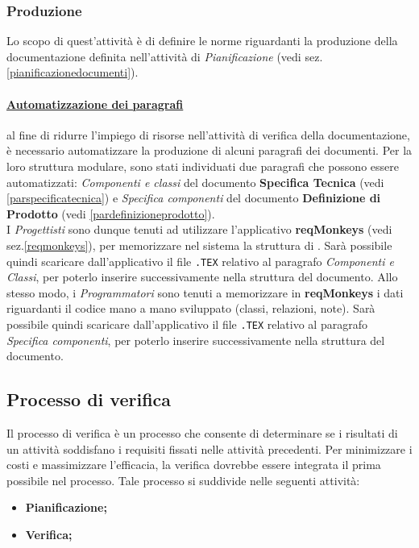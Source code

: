 \subsubsection{Produzione}
Lo scopo di quest'attività è di definire le norme riguardanti la produzione della documentazione definita nell'attività di \textit{Pianificazione} (vedi sez. \ref{pianificazionedocumenti}).

\paragraph{\underline{Automatizzazione dei paragrafi}}
\label{automatizzazioneparagrafi}
al fine di ridurre l'impiego di risorse nell'attività di verifica della documentazione, è necessario automatizzare la produzione di alcuni paragrafi dei documenti. Per la loro struttura modulare, sono stati individuati due paragrafi che possono essere automatizzati: \textit{Componenti e classi} del documento \textbf{Specifica Tecnica} (vedi \ref{parspecificatecnica}) e \textit{Specifica componenti} del documento \textbf{Definizione di Prodotto} (vedi \ref{pardefinizioneprodotto}).\\
I \textit{Progettisti} sono dunque tenuti ad utilizzare l'applicativo \textbf{reqMonkeys} (vedi sez.\ref{reqmonkeys}), per memorizzare nel sistema la struttura di \project{}. Sarà possibile quindi scaricare dall'applicativo il file \verb!.TEX! relativo al paragrafo \textit{Componenti e Classi}, per poterlo inserire successivamente nella struttura del documento.
Allo stesso modo, i \textit{Programmatori} sono tenuti a memorizzare in \textbf{reqMonkeys} i dati riguardanti il codice mano a mano sviluppato (classi, relazioni, note). Sarà possibile quindi scaricare dall'applicativo il file \verb!.TEX! relativo al paragrafo \textit{Specifica componenti}, per poterlo inserire successivamente nella struttura del documento.

\subsection{Processo di verifica}
\label{processoverifica}
Il processo di verifica è un processo che consente di determinare se i risultati di un attività soddisfano i requisiti fissati nelle attività precedenti. Per minimizzare i costi e massimizzare l'efficacia, la verifica dovrebbe essere integrata il prima possibile nel processo. Tale processo si suddivide nelle seguenti attività:
\begin{itemize}
\item \textbf{Pianificazione;}
\item \textbf{Verifica;}
\end{itemize}

